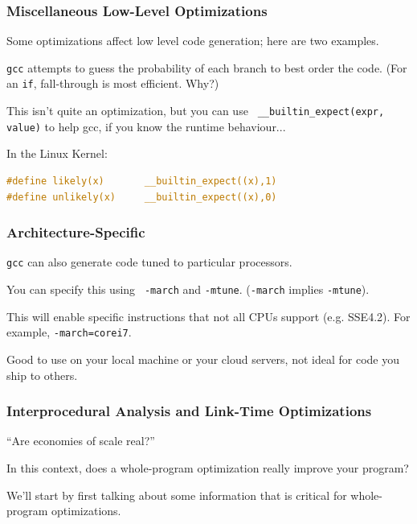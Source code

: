 \begin{frame}[fragile]
\frametitle{Miscellaneous Low-Level Optimizations}

Some optimizations affect low level code generation; here are two examples.

{\tt gcc} attempts to guess the probability of each branch to
best order the code. (For an {\tt if}, fall-through is most efficient. Why?)

This isn't quite an optimization, but you can use {\tt
  \_\_builtin\_expect(expr, value)} to help gcc, if you know the runtime behaviour...
  
  In the Linux Kernel:
  \begin{lstlisting}[language=C]
#define likely(x)       __builtin_expect((x),1)
#define unlikely(x)     __builtin_expect((x),0)
  \end{lstlisting}



\end{frame}


\begin{frame}
\frametitle{Architecture-Specific}

{\tt gcc} can also generate code tuned to particular
processors. 

You can specify this using {\tt
  -march} and {\tt -mtune}. ({\tt -march} implies {\tt -mtune}).


This will enable specific instructions that not all CPUs support (e.g. SSE4.2).
For example, {\tt -march=corei7}.

\noindent
Good to use on your local machine or your cloud servers, not ideal for code you ship to others.


\end{frame}



\begin{frame}
\frametitle{Interprocedural Analysis and Link-Time Optimizations}

``Are economies of scale real?''

In this context, does a
whole-program optimization really improve your program?


We'll start by first talking about some information that is critical for
whole-program optimizations.

\end{frame}


